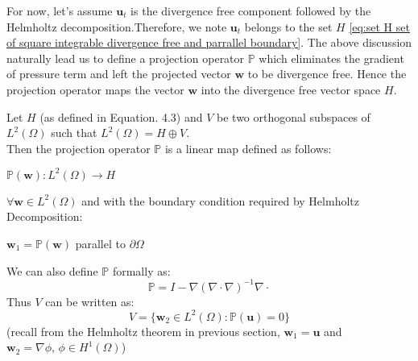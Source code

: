 For now, let's assume $\textbf{u}_t$ is the divergence free component followed by the Helmholtz decomposition.Therefore, we note $\textbf{u}_t$ belongs to the set $H$ \eqref{eq:set H set of square integrable divergence free and parrallel boundary}.
The above discussion naturally lead us to define a projection operator $\mathbb{P}$ which eliminates the gradient of pressure term and left the projected vector $\textbf{w}$ to be divergence free. Hence the projection operator maps the vector $\textbf{w}$ into the divergence free vector space $H$. 

\begin{mydef}
Let $\textit{H}$ (as defined in Equation. 4.3) and $\textit{V}$ be two orthogonal subspaces of $\textit{L}^2 (\Omega)$ such that $\textit{L}^2 (\Omega) = \textit{H} \oplus \textit{V}$.\\

Then the projection operator $\mathbb{P}$ is a linear map defined as follows:
\begin{center}
$\mathbb{P} (\textbf{w}): \textit{L}^2 (\Omega) \rightarrow \textit{H}$\\
\end{center}
$\forall \textbf{w} \in \textit{L}^2 (\Omega)$ and with the boundary condition required by Helmholtz Decomposition:
\begin{center}
$\textbf{w}_1 = \mathbb{P} (\textbf{w})$ parallel to $\partial \Omega$
\end{center}
We can also define $\mathbb{P}$ formally as:
\begin{equation}\label{eq:definition of projection operator}
\mathbb{P} = I - \nabla (\nabla \cdot \nabla)^{-1} \nabla \cdot
\end{equation}
Thus $\textit{V}$ can be written as:
\begin{dmath*}\label{eq:set V}
V = \lbrace { \textbf{w}_2 \in \textit{L}^2 (\Omega): \mathbb{P} (\textbf{u}) = 0} \rbrace 
\end{dmath*}
(recall from the Helmholtz theorem in previous section, $\textbf{w}_1 = \textbf{u}$ and $\textbf{w}_2 = \nabla \phi,\,\phi \in H^1(\Omega)$)\\
\end{mydef}

